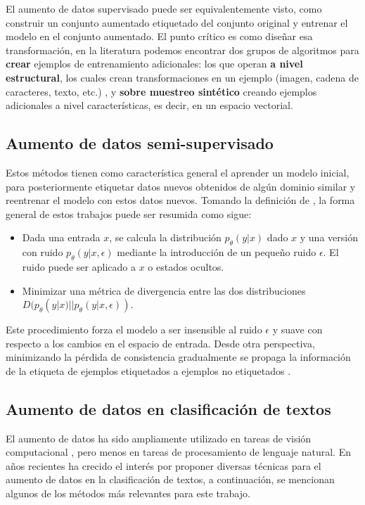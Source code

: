 El aumento de datos supervisado puede ser equivalentemente visto, como construir un conjunto aumentado etiquetado del conjunto original y entrenar el modelo en el conjunto aumentado. El punto crítico es como diseñar esa transformación, en la literatura podemos encontrar dos grupos de algoritmos para \textbf{crear} ejemplos de entrenamiento adicionales: los que operan \textbf{a nivel estructural}, los cuales crean transformaciones en un ejemplo (imagen, cadena de caracteres, texto, etc.) \citep{zhong2017random}, y \textbf{sobre muestreo sintético} creando ejemplos adicionales a nivel características, es decir, en un espacio vectorial\citep{chawla2002smote}. 

\subsection{Aumento de datos semi-supervisado}

Estos métodos tienen como característica general el aprender un modelo inicial, para posteriormente etiquetar datos nuevos obtenidos de algún dominio similar y reentrenar el modelo con estos datos nuevos. Tomando la definición de \citep{xie2019unsupervised}, la forma general de estos trabajos puede ser resumida como sigue:

\begin{itemize}
    \item Dada una entrada $x$, se calcula la distribución $p_\theta (y|x)$ dado $x$ y una versión con ruido $p_\theta (y|x, \epsilon)$ mediante la introducción de un pequeño ruido $\epsilon$. El ruido puede ser aplicado a $x$ o estados ocultos.
    \item Minimizar una métrica de divergencia entre las dos distribuciones $D (p_\theta (y|x) || p_\theta (y|x, \epsilon))$.
\end{itemize}

Este procedimiento forza el modelo a ser insensible al ruido $\epsilon$ y suave con respecto a los cambios en el espacio de entrada. Desde otra perspectiva, minimizando la pérdida de consistencia gradualmente se propaga la información de la etiqueta de ejemplos etiquetados a ejemplos no etiquetados \citep{Miyato2019}.


\subsection{Aumento de datos en clasificación de textos}

El aumento de datos ha sido ampliamente utilizado en tareas de visión computacional \citep{cubuk2019autoaugment}, pero menos en tareas de procesamiento de lenguaje natural. En años recientes ha crecido el interés por proponer diversas técnicas para el aumento de datos en la clasificación de textos, a continuación, se mencionan algunos de los métodos más relevantes para este trabajo.

